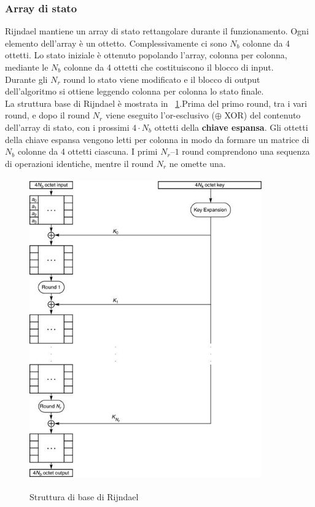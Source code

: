 \subsubsection{Array di stato}
Rijndael mantiene un array di stato rettangolare durante il funzionamento. Ogni elemento dell'array è un ottetto. Complessivamente ci sono $N_{b}$ colonne da 4 ottetti. Lo stato iniziale è ottenuto popolando l’array, colonna per colonna, mediante le $N_{b}$ colonne da 4 ottetti che costituiscono il blocco di input. \\

Durante gli $N_{r}$ round lo stato viene modificato e il blocco di output dell'algoritmo si ottiene leggendo colonna per colonna lo stato finale. \\

La struttura base di Rijndael è mostrata in \figurename ~\ref{fig:Rij_struct}.Prima del primo round, tra i vari round, e dopo il round $N_{r}$ viene eseguito l'or-esclusivo ($\oplus$ XOR) del contenuto dell'array di stato, con i prossimi $4\cdot N_{b}$ ottetti della \textbf{chiave espansa}. Gli ottetti della chiave espansa vengono letti per colonna in modo da formare un matrice di $N_{b}$ colonne da 4 ottetti ciascuna. I primi $N_{r} – 1$ round comprendono una sequenza di operazioni identiche, mentre il round $N_{r}$ ne omette una.

\begin{figure}[htbp]
	\centering%
	\subfigure%
	{\includegraphics[height=13cm, width=10cm, keepaspectratio]{Immagini/Capitolo2/rijndael_struttura.png}}
	\caption{Struttura di base di Rijndael \label{fig:Rij_struct}} 	
\end{figure}


